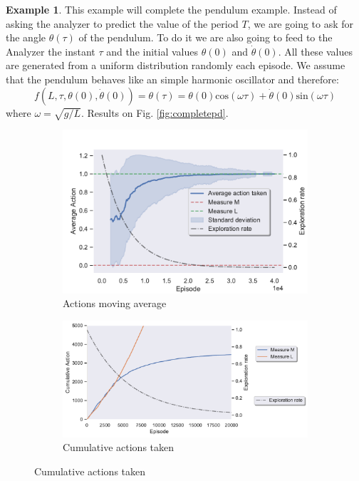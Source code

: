 \documentclass[11pt,a4paper,twoside]{report}
\newcommand{\+}{\textnormal{+} }
\theoremstyle{definition}
\newtheorem{myex}[mythm]{Example}
\numberwithin{equation}{chapter}
\begin{document}
  \begin{myex}\label{pendulumcomplete}
    This example will complete the pendulum example. Instead of asking the 
    analyzer to predict the value of the period $T$, we are going to ask for 
    the angle $\theta(\tau)$ of the pendulum. To do it we are also going
    to feed to the Analyzer the instant $\tau$ and the initial values
    $\theta(0)$ and $\dot\theta(0)$. All these values are generated from a
    uniform distribution randomly each episode. We assume that the pendulum
    behaves like an simple harmonic oscillator and therefore:
    \begin{equation}
      f(L,\tau, \theta(0),\dot\theta(0))=\theta(\tau)=
      \theta(0)\text{cos}(\omega\tau)+ \dot\theta(0)\text{sin}(\omega\tau)
    \end{equation}
    where $\omega = \sqrt{g/L}$. Results on Fig. \ref{fig:completepd}.

    \begin{figure}  %
      \begin{subfigure}{0.45\textwidth}
      \includegraphics[width=\linewidth]{figures/Action-MAB5.pdf}
      \caption{Actions moving average}
      \end{subfigure}
      \hfill %
      \begin{subfigure}{0.45\textwidth}
      \includegraphics[width=\linewidth]{figures/Cum-action-MAB5.pdf}
      \caption{Cumulative actions taken}
      \end{subfigure}
      

\end{figure}
\end{myex}
\end{document}
